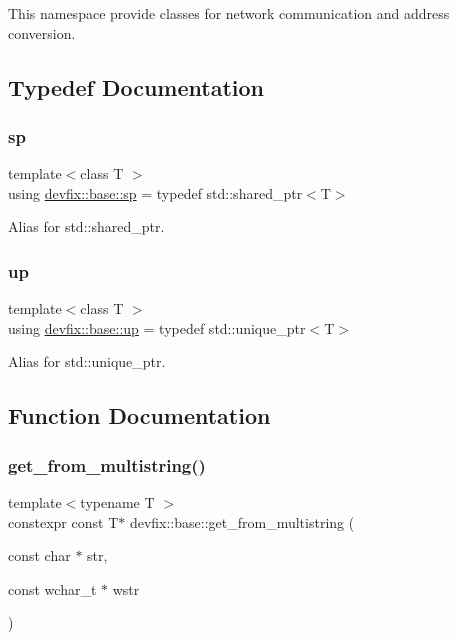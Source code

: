 This namespace provide classes for network communication and address conversion. 

\subsection{Typedef Documentation}
\mbox{\label{namespacedevfix_1_1base_ad239a07977b9e77ffabaf558636d0b8b}} 
\subsubsection{\texorpdfstring{sp}{sp}}
{\footnotesize\ttfamily template$<$class T $>$ \\
using \hyperlink{namespacedevfix_1_1base_ad239a07977b9e77ffabaf558636d0b8b}{devfix\+::base\+::sp} = typedef std\+::shared\+\_\+ptr$<$T$>$}



Alias for std\+::shared\+\_\+ptr. 

\mbox{\label{namespacedevfix_1_1base_a18dfbd492717795cee1cfa6f14a8f724}} 
\subsubsection{\texorpdfstring{up}{up}}
{\footnotesize\ttfamily template$<$class T $>$ \\
using \hyperlink{namespacedevfix_1_1base_a18dfbd492717795cee1cfa6f14a8f724}{devfix\+::base\+::up} = typedef std\+::unique\+\_\+ptr$<$T$>$}



Alias for std\+::unique\+\_\+ptr. 



\subsection{Function Documentation}
\mbox{\label{namespacedevfix_1_1base_a84282bc5458412dfed5ce8b039a70519}} 
\subsubsection{\texorpdfstring{get\+\_\+from\+\_\+multistring()}{get\_from\_multistring()}}
{\footnotesize\ttfamily template$<$typename T $>$ \\
constexpr const T$\ast$ devfix\+::base\+::get\+\_\+from\+\_\+multistring (\begin{DoxyParamCaption}\item[{const char $\ast$}]{str,  }\item[{const wchar\+\_\+t $\ast$}]{wstr }\end{DoxyParamCaption})}

